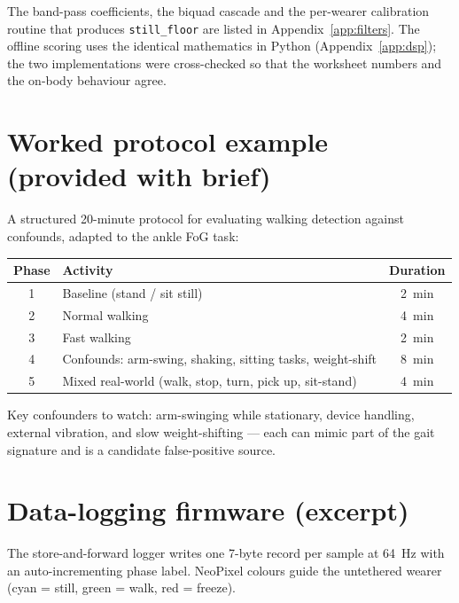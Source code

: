 \documentclass[11pt,a4paper]{article}
\begin{document}
The band-pass coefficients, the biquad cascade and the per-wearer calibration routine
that produces \texttt{still\_floor} are listed in Appendix~\ref{app:filters}. The
offline scoring uses the identical mathematics in Python (Appendix~\ref{app:dsp}); the
two implementations were cross-checked so that the worksheet numbers and the on-body
behaviour agree.

\appendix
\section{Worked protocol example (provided with brief)}
\label{app:protocol}

A structured 20-minute protocol for evaluating walking detection against confounds,
adapted to the ankle FoG task:

\begin{table}[H]
\centering
\begin{tabular}{@{}c l c@{}}
\toprule
\textbf{Phase} & \textbf{Activity} & \textbf{Duration}\\
\midrule
1 & Baseline (stand / sit still)            & \SI{2}{\minute}\\
2 & Normal walking                          & \SI{4}{\minute}\\
3 & Fast walking                            & \SI{2}{\minute}\\
4 & Confounds: arm-swing, shaking, sitting tasks, weight-shift & \SI{8}{\minute}\\
5 & Mixed real-world (walk, stop, turn, pick up, sit-stand)    & \SI{4}{\minute}\\
\bottomrule
\end{tabular}
\end{table}

\noindent Key confounders to watch: arm-swinging while stationary, device handling,
external vibration, and slow weight-shifting --- each can mimic part of the gait
signature and is a candidate false-positive source.

\section{Data-logging firmware (excerpt)}
\label{app:logger}

The store-and-forward logger writes one 7-byte record per sample at \SI{64}{\hertz}
with an auto-incrementing phase label. NeoPixel colours guide the untethered wearer
(cyan = still, green = walk, red = freeze).
\end{document}
